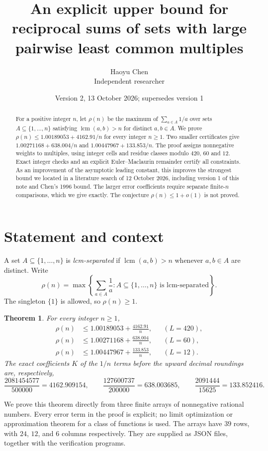 \documentclass[10pt]{article}
\title{An explicit upper bound for reciprocal sums of sets with large
pairwise least common multiples}
\author{Haoyu Chen\\ Independent researcher}
\date{Version 2, 13 October 2026; supersedes version 1}
\newtheorem{theorem}{Theorem}[section]
\theoremstyle{remark}
\newcommand{\lcm}{\operatorname{lcm}}
\begin{document}
\maketitle
\begin{abstract}
For a positive integer $n$, let $\rho(n)$ be the maximum of
$\sum_{a\in A}1/a$ over sets $A\subseteq\{1,\ldots,n\}$ satisfying
$\lcm(a,b)>n$ for distinct $a,b\in A$. We prove
$\rho(n)\le 1.00189053+4162.91/n$ for every integer $n\ge1$.
Two smaller certificates give $1.00271168+638.004/n$ and
$1.00447967+133.853/n$. The proof assigns nonnegative weights to
multiples, using integer cells and residue classes modulo $420$, $60$
and $12$. Exact integer checks and an explicit Euler--Maclaurin
remainder certify all constraints. As an improvement of the asymptotic
leading constant, this improves the strongest bound we located in a
literature search of 12 October 2026, including version 1 of this note
and Chen's 1996 bound. The larger error coefficients require separate
finite-$n$ comparisons, which we give exactly. The conjecture
$\rho(n)\le1+o(1)$ is not proved.
\end{abstract}

\section{Statement and context}
A set $A\subseteq\{1,\ldots,n\}$ is \emph{lcm-separated} if
$\lcm(a,b)>n$ whenever $a,b\in A$ are distinct. Write
\[
 \rho(n)=\max\left\{\sum_{a\in A}\frac1a:
 A\subseteq\{1,\ldots,n\}\text{ is lcm-separated}\right\}.
\]
The singleton $\{1\}$ is allowed, so $\rho(n)\ge1$.

\begin{theorem}\label{thm:main}
For every integer $n\ge1$,
\begin{align*}
 \rho(n)&\le1.00189053+\frac{4162.91}{n}, &&(L=420),\\
 \rho(n)&\le1.00271168+\frac{638.004}{n}, &&(L=60),\\
 \rho(n)&\le1.00447967+\frac{133.853}{n}, &&(L=12).
\end{align*}
The exact coefficients $K$ of the $1/n$ terms before the upward decimal
roundings are, respectively,
\[
 \frac{2081454577}{500000}=4162.909154,\qquad
 \frac{127600737}{200000}=638.003685,\qquad
 \frac{2091444}{15625}=133.852416.
\]
\end{theorem}

We prove this theorem directly from three finite arrays of nonnegative
rational numbers. Every error term in the proof is explicit; no limit
optimization or approximation theorem for a class of functions is used.
The arrays have $39$ rows, with $24$, $12$, and $6$ columns respectively.
They are supplied as JSON files, together with the verification programs.
\end{document}

